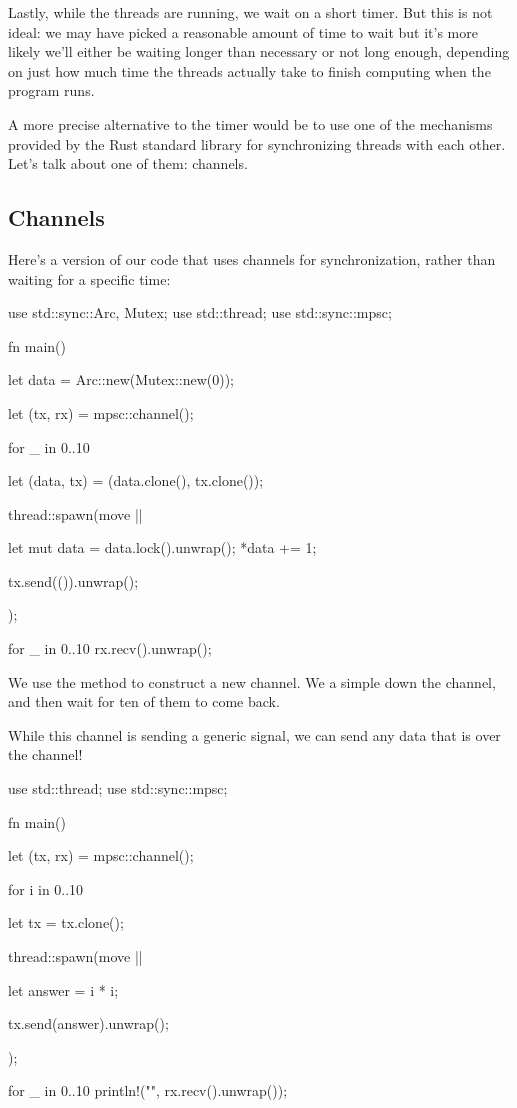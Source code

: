 \blank

Lastly, while the threads are running, we wait on a short timer. But this is not ideal: we may have picked a reasonable amount of 
time to wait but it's more likely we'll either be waiting longer than necessary or not long enough, depending on just how much time 
the threads actually take to finish computing when the program runs.

\blank

A more precise alternative to the timer would be to use one of the mechanisms provided by the Rust standard library for synchronizing 
threads with each other. Let's talk about one of them: channels.

\subsection*{Channels}

Here's a version of our code that uses channels for synchronization, rather than waiting for a specific time:

\begin{rustc}
use std::sync::{Arc, Mutex};
use std::thread;
use std::sync::mpsc;

fn main() {
    let data = Arc::new(Mutex::new(0));

    let (tx, rx) = mpsc::channel();

    for _ in 0..10 {
        let (data, tx) = (data.clone(), tx.clone());

        thread::spawn(move || {
            let mut data = data.lock().unwrap();
            *data += 1;

            tx.send(()).unwrap();
        });
    }

    for _ in 0..10 {
        rx.recv().unwrap();
    }
}
\end{rustc}

We use the  method to construct a new channel. We  a simple \code{()} down the channel, and then 
wait for ten of them to come back.

\blank

While this channel is sending a generic signal, we can send any data that is  over the channel!

\begin{rustc}
use std::thread;
use std::sync::mpsc;

fn main() {
    let (tx, rx) = mpsc::channel();

    for i in 0..10 {
        let tx = tx.clone();

        thread::spawn(move || {
            let answer = i * i;

            tx.send(answer).unwrap();
        });
    }

    for _ in 0..10 {
        println!("{}", rx.recv().unwrap());
    }
}
\end{rustc}

